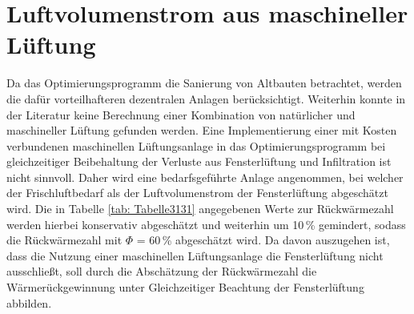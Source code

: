 \section*{Luftvolumenstrom aus maschineller Lüftung}

Da das Optimierungsprogramm die Sanierung von Altbauten betrachtet, werden die dafür vorteilhafteren dezentralen Anlagen berücksichtigt.
Weiterhin konnte in der Literatur keine Berechnung einer Kombination von natürlicher und maschineller Lüftung gefunden werden.
Eine Implementierung einer mit Kosten verbundenen maschinellen Lüftungsanlage in das Optimierungsprogramm bei gleichzeitiger Beibehaltung der Verluste aus Fensterlüftung und Infiltration ist nicht sinnvoll.
Daher wird eine bedarfsgeführte Anlage angenommen, bei welcher der Frischluftbedarf als der Luftvolumenstrom der Fensterlüftung abgeschätzt wird.
Die in Tabelle \ref{tab: Tabelle3131} angegebenen Werte zur Rückwärmezahl werden hierbei konservativ abgeschätzt und weiterhin um 10\,\% gemindert, sodass die Rückwärmezahl mit \(\Phi\) = 60\,\%  abgeschätzt wird.
Da davon auszugehen ist, dass die Nutzung einer maschinellen Lüftungsanlage die Fensterlüftung nicht ausschließt, soll durch die Abschätzung der Rückwärmezahl die Wärmerückgewinnung unter Gleichzeitiger Beachtung der Fensterlüftung abbilden.



